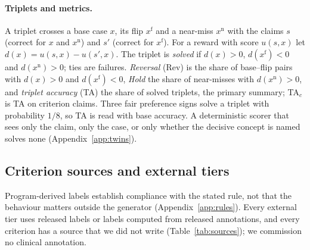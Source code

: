 \documentclass[11pt]{article}
\newcommand{\xf}{x^{\mathrm{f}}}
\newcommand{\xn}{x^{\mathrm{n}}}
\begin{document}
\paragraph{Triplets and metrics.}
A triplet crosses a base case $x$, its flip $\xf$ and a near-miss $\xn$ with
the claims $s$ (correct for $x$ and $\xn$) and $s'$ (correct for $\xf$). For a
reward with score $u(s,x)$ let $d(x)=u(s,x)-u(s',x)$. The triplet is
\emph{solved} if $d(x)>0$, $d(\xf)<0$ and $d(\xn)>0$; ties are failures.
\emph{Reversal} (Rev) is the share of base--flip pairs with $d(x)>0$ and
$d(\xf)<0$, \emph{Hold} the share of near-misses with $d(\xn)>0$, and
\emph{triplet accuracy} (TA) the share of solved triplets, the primary
summary; TA$_{c}$ is TA on criterion claims. Three fair preference signs
solve a triplet with probability $1/8$, so TA is read with base accuracy. A
deterministic scorer that sees only the claim, only the case, or only
whether the decisive concept is named solves none
(Appendix~\ref{app:twins}).

\subsection{Criterion sources and external tiers}
\label{sec:sources}

Program-derived labels establish compliance with the stated rule, not that
the behaviour matters outside the generator (Appendix~\ref{app:rules}).
Every external tier uses released labels or labels computed from released
annotations, and every criterion has a source that we did not write
(Table~\ref{tab:sources}); we commission no clinical annotation.
\end{document}
